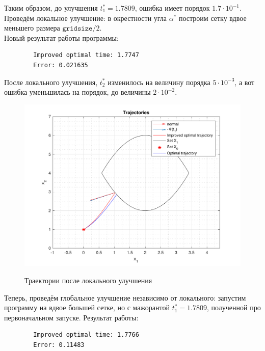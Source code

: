 \documentclass[11pt, oneside, final]{article}
\theoremstyle{break}
\numberwithin{equation}{section}
\theoremstyle{plain}
\theoremstyle{definition}
\begin{document}
    Таким образом, до улучшения \(t^*_1 = 1.7809 \), ошибка имеет порядок \(1.7 \cdot 10^{-1}\).\\
    Проведём локальное улучшение: в окрестности угла \(\alpha^*\) построим сетку вдвое меньшего размера \(\mathtt{gridsize} / 2\). \\
    \pagebreak
    \noindent Новый результат работы программы:  
    \begin{verbatim}
        Improved optimal time: 1.7747
        Error: 0.021635
    \end{verbatim}
    После локального улучшения, \(t^*_2\) изменилось на величину порядка \(5 \cdot 10^{-3}\), а вот ошибка уменьшилась на порядок, до величины \(2 \cdot 10^{-2}\). \\
    \begin{figure}[H]
        \centering
        \includegraphics[width=\linewidth]{s1fig2}
        \label{pic:s1:2}
        \caption{Траектории после локального улучшения}
    \end{figure}
    \noindent
    Теперь, проведём глобальное улучшение независимо от локального: запустим программу на вдвое большей сетке, но с мажорантой \(t^*_1 = 1.7809 \), полученной про первоначальном запуске. Результат работы:
    \begin{verbatim}
        Improved optimal time: 1.7766
        Error: 0.11483
    \end{verbatim}
\end{document}

